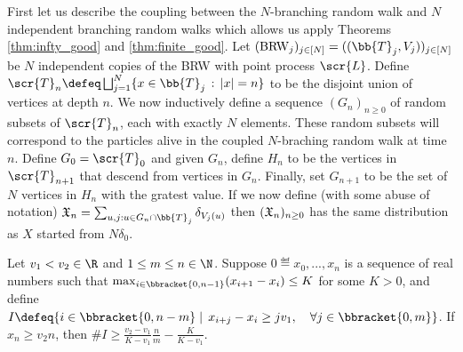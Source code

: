 First let us describe the coupling between the $N$-branching random walk and $N$ independent branching random walks which allows us apply Theorems \ref{thm:infty_good} and \ref{thm:finite_good}. Let $(\text{BRW}_j)_{j \in [N]} = ((\bb{T}_j, V_j))_{j \in [N]}$ be $N$ independent copies of the BRW with point process $\scr{L}$. Define $\scr{T}_n \defeq \bigsqcup_{j=1}^N \{ x \in \bb{T}_j \,:\, |x|=n \}$ to be the disjoint union of vertices at depth $n$. We now inductively define a sequence $(G_n)_{n \geq 0}$ of random subsets of $\scr{T}_n$, each with exactly $N$ elements. These random subsets will correspond to the particles alive in the coupled $N$-braching random walk at time $n$. Define $G_0 = \scr{T}_0$ and given $G_n$, define $H_n$ to be the vertices in $\scr{T}_{n+1}$ that descend from vertices in $G_n$. Finally, set $G_{n+1}$ to be the set of $N$ vertices in $H_n$ with the gratest value. If we now define (with some abuse of notation) $\frak{X}_n = \sum_{u,j : u \in G_n \cap \bb{T}_j} \delta_{V_j(u)}$ then $(\frak{X}_n)_{n \geq 0}$ has the same distribution as $X$ started from $N \delta_0$. 

\begin{lemma}\label{lem:ExpTailsGoodSequencesTechnical}
Let $v_1 < v_2 \in \R$ and $1 \leq m \leq n \in \N$. Suppose $0 \eqdef x_0, ..., x_n$ is a sequence of real numbers such that $\max_{i \in \bbracket{0, n - 1}} (x_{i+1} - x_i) \leq K$ for some $K > 0$, and define $I \defeq \{ i \in \bbracket{0, n - m} \mid\, x_{i + j} - x_i \geq j v_1,\quad \forall j\in\bbracket{0,m}\}$. If $x_n \geq v_2 n$, then $\#I \geq \frac{v_2 - v_1}{K - v_1}\frac{n}{m} - \frac{K}{K - v_1}$. 
\end{lemma}

